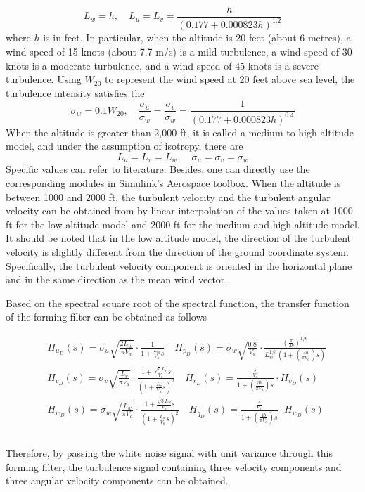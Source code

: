 \begin{equation}\label{eq2}
L_w=h, \quad L_u=L_v=\frac{h}{(0.177+0.000823 h)^{1.2}}
\end{equation}
where $h$ is in feet. In particular, when the altitude is 20 feet (about 6 metres), a wind speed of 15 knots (about 7.7 m/s) is a mild turbulence, a wind speed of 30 knots is a moderate turbulence, and a wind speed of 45 knots is a severe turbulence. Using $W_{20}$ to represent the wind speed at 20 feet above sea level, the turbulence intensity satisfies the
\begin{equation}\label{eq3}
\sigma_w=0.1 W_{20}, \quad \frac{\sigma_u}{\sigma_w}=\frac{\sigma_v}{\sigma_w}=\frac{1}{(0.177+0.000823 h)^{0.4}}
\end{equation}
When the altitude is greater than 2,000 ft, it is called a medium to high altitude model, and under the assumption of isotropy, there are
\begin{equation}\label{eq4}
L_u=L_v=L_w, \quad \sigma_u=\sigma_v=\sigma_w
\end{equation}
Specific values can refer to literature\cite{military1980u}. Besides, one can directly use the corresponding modules in Simulink's Aerospace toolbox. When the altitude is between 1000 and 2000 ft, the turbulent velocity and the turbulent angular velocity can be obtained from by linear interpolation of the values taken at 1000 ft for the low altitude model and 2000 ft for the medium and high altitude model. It should be noted that in the low altitude model, the direction of the turbulent velocity is slightly different from the direction of the ground coordinate system. Specifically, the turbulent velocity component is oriented in the horizontal plane and in the same direction as the mean wind vector.

Based on the spectral square root of the spectral function, the transfer function of the forming filter can be obtained as follows

\begin{equation}\label{eq5}
\begin{aligned}
& H_{u_D}(s)=\sigma_u \sqrt{\frac{2 L_{u l}}{\pi V_a}} \cdot \frac{1}{1+\frac{L_{u l}}{V_a} s} \quad H_{p_D}(s)=\sigma_w \sqrt{\frac{0.8}{V_a}} \cdot \frac{\left(\frac{\pi}{4 b}\right)^{1 / 6}}{L_w^{1 / 3}\left(1+\left(\frac{4 b}{\pi V_a}\right) s\right)} \\
& H_{v_D}(s)=\sigma_v \sqrt{\frac{L_v}{\pi V_a}} \cdot \frac{1+\frac{\sqrt{3} L_v}{V_a} s}{\left(1+\frac{L_v}{V_a} s\right)^2} \quad H_{r_D}(s)=\frac{\frac{s}{V_a}}{1+\left(\frac{3 b}{\pi V_a}\right) s} \cdot H_{v_D}(s) \\
& H_{w_D}(s)=\sigma_w \sqrt{\frac{L_w}{\pi V_a}} \cdot \frac{1+\frac{\sqrt{3} L_w}{V_a} s}{\left(1+\frac{L_w}{V_a} s\right)^2} \quad H_{q_D}(s)=\frac{\frac{s}{V_a}}{1+\left(\frac{4 b}{\pi V_a}\right) s} \cdot H_{w_D}(s) \\
\end{aligned}
\end{equation}\\
Therefore, by passing the white noise signal with unit variance through this forming filter, the turbulence signal containing three velocity components and three angular velocity components can be obtained.

